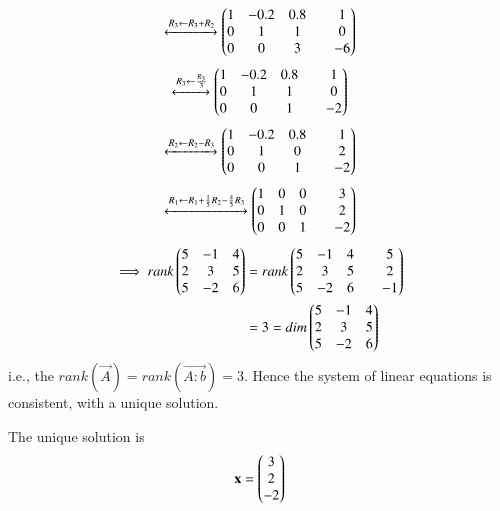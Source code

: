 \documentclass[journal,12pt,twocolumn]{IEEEtran}
\begin{document}
\begin{align}
	\xleftrightarrow[]{ R_3 \leftarrow R_3+R_2}
        \begin{pmatrix}1 & -0.2 & 0.8 & & 1 \\ 
	       0 & 1 & 1 & & 0 \\ 0 & 0 & 3 & & -6\end{pmatrix}
\end{align}
\begin{align}
	\xleftrightarrow[]{R_3 \leftarrow \frac{R_3}{3}}
        \begin{pmatrix}1 & -0.2 & 0.8 & & 1 \\ 
	       0 & 1 & 1 & & 0 \\ 0 & 0 & 1 & & -2\end{pmatrix}
\end{align}
\begin{align}
	\xleftrightarrow[]{R_2 \leftarrow R_2-R_3}
        \begin{pmatrix}1 &-0.2 & 0.8 & & 1 \\ 
	       0 & 1 & 0 & & 2 \\ 0 & 0 & 1 & & -2\end{pmatrix}
\end{align}
\begin{align}
	\xleftrightarrow[]{R_1 \leftarrow R_1+\frac{1}{5}R_2-\frac{4}{5}R_3}
        \begin{pmatrix}1 & 0 & 0 & & 3 \\ 
	       0 & 1 & 0 & & 2 \\ 0 & 0 & 1 & & -2\end{pmatrix}
\end{align}
\begin{align}
	\implies rank \begin{pmatrix} 5 & -1 & 4 \\ 2 &  3 & 5 \\ 5 & -2 & 6 \end{pmatrix}
	&=
	rank \begin{pmatrix} 5 & -1 & 4 & & 5 \\ 2 & 3 & 5 & & 2 \\ 5 & -2 & 6 & & -1\end{pmatrix}
		\nonumber \\
	&= 3 = dim \begin{pmatrix} 5 & -1 & 4 \\ 2 &  3 & 5 \\ 5 & -2 & 6 \end{pmatrix}
\end{align}
i.e., the $rank(\vec{A}) = rank(\vec{A:b}) = 3$. Hence the system of linear equations is consistent, with a unique solution. 

The unique solution is 
\begin{align}
	\mathbf{x} = \begin{pmatrix}3\\2\\-2\end{pmatrix}
\end{align}
\end{document}
